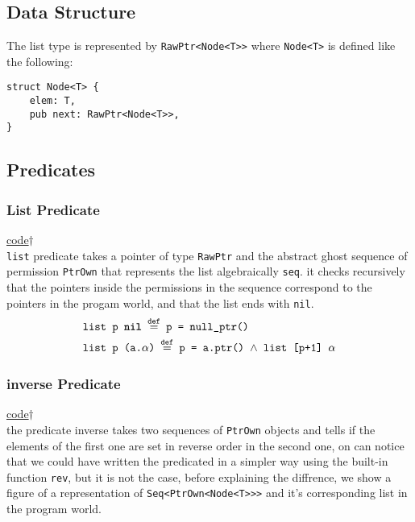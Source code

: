 \documentclass[11pt,a4paper]{report}
\begin{document}
\subsection{Data Structure}
The list type is represented by \texttt{RawPtr<Node<T>>} where \texttt{Node<T>} is defined like the following:
\begin{verbatim}
struct Node<T> {
    elem: T,
    pub next: RawPtr<Node<T>>,
}
\end{verbatim}

\subsection{Predicates}
\subsubsection{List Predicate}
\hyperlink{list}{code$\dagger$}\\
\texttt{list} predicate takes a pointer of type \texttt{RawPtr} and the abstract ghost sequence of permission \texttt{PtrOwn} that represents the list algebraically \texttt{seq}. it checks recursively that the pointers inside the permissions in the sequence correspond to the pointers in the progam world, and that the list ends with \texttt{nil}.\\
\begin{align}
    &\texttt{list p \textbf{nil} $\overset{\text{def}}{=}$ p = null\_ptr()}\\
    &\texttt{list p (a.$\alpha$) $\overset{\text{def}}{=}$ p = a.ptr() $\land$ list [p+1] $\alpha$}
\end{align}

\subsubsection{inverse Predicate}
\hyperlink{inverse}{code$\dagger$}\\
the predicate inverse takes two sequences of \texttt{PtrOwn} objects and tells if the elements of the first one are set in reverse order in the second one, on can notice that we could have written the predicated in a simpler way using the built-in function \texttt{rev}, but it is not the case, before explaining the diffrence, we show a figure of a representation of \texttt{Seq<PtrOwn<Node<T>>>} and it's corresponding list in the program world.
\end{document}
